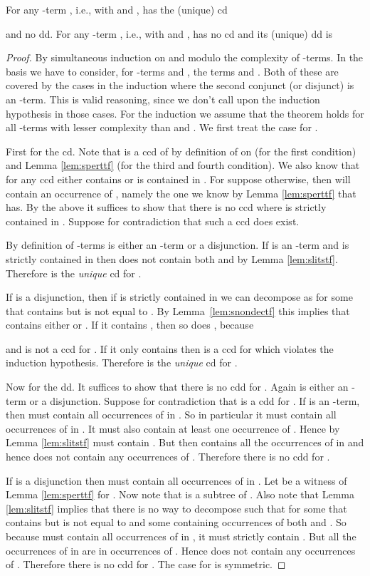 \begin{theorem}
\label{thm:scddd}
For any -term , i.e., with  and ,
 has the (unique) cd

and no dd. For any -term , i.e., with  and ,  has no cd and its (unique) dd is

\end{theorem}
\begin{proof}
By simultaneous induction on  and  modulo the
complexity of -terms. In the basis we have to consider, for -terms
 and , the terms  and . Both of these are
covered by the cases in the induction where the second conjunct (or disjunct)
 is an -term. This is valid reasoning, since we don't call upon the
induction hypothesis in those cases. For the induction we assume that the
theorem holds for all -terms with lesser complexity than  and
. We first treat the case for .

First for the cd. Note that  is a ccd of
 by definition of  on  (for the first
condition) and Lemma \ref{lem:sperttf} (for the third and fourth condition). We
also know that for any ccd  either  contains or is contained in
. For suppose otherwise, then  will contain an occurrence of
, namely the one we know by Lemma \ref{lem:sperttf} that  has.
By the above it suffices to show that there is no ccd  where  is
strictly contained in . Suppose for contradiction that such a ccd  does exist.

By definition of -terms  is either an -term or a disjunction. If
 is an -term and  is strictly contained in  then 
does not contain both  and  by Lemma \ref{lem:slitstf}.
Therefore  is the \emph{unique} cd for
.

If  is a disjunction, then if  is strictly contained in  we can
decompose  as  for some  that
contains but is not equal to . By Lemma~\ref{lem:snondectf} this implies
that  contains either  or . If it contains , then so
does , because 

and  is not a ccd for . If it only contains
 then  is a ccd for  which violates the induction
hypothesis. Therefore  is the \emph{unique}
cd for .

Now for the dd. It suffices to show that there is no cdd for . Again  is either an -term or a disjunction. Suppose for
contradiction that  is a cdd for . If  is an
-term, then  must contain all occurrences of  in . So in particular it must contain all occurrences of  in
. It must also contain at least one occurrence of . Hence by
Lemma \ref{lem:slitstf}  must contain . But then  contains all
the occurrences of  in  and hence  does not
contain any occurrences of .  Therefore there is no cdd for .

If  is a disjunction then  must contain all occurrences of  in
. Let  be a witness of Lemma \ref{lem:sperttf} for .
Now note that  is a subtree of . Also
note that Lemma \ref{lem:slitstf} implies that there is no way to decompose
 such that  for
some  that contains but is not equal to  and some 
containing occurrences of both  and . So because  must
contain all occurrences of  in , it must strictly
contain . But all the occurrences of  in 
are in occurrences of . Hence  does not contain any occurrences of
. Therefore there is no cdd for .  The case for
 is symmetric.
\end{proof}

